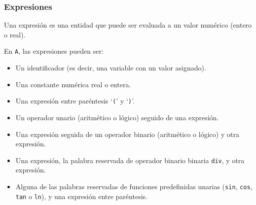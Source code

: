 \documentclass[12pt]{article}
\begin{document}
\subsubsection{Expresiones}
Una expresión es una entidad que puede ser evaluada a un valor numérico (entero o real).\par
En \texttt{A}, las expresiones pueden ser:
\begin{itemize}
    \item Un identificador (es decir, una variable con un valor asignado).
    \item Una constante numérica real o entera.
    \item Una expresión entre paréntesis `\texttt{(}' y `\texttt{)}'.
    \item Un operador unario (aritmético o lógico) seguido de una expresión.
    \item Una expresión seguida de un operador binario (aritmético o lógico) y otra expresión.
    \item Una expresión, la palabra reservada de operador binario binaria \texttt{div}, y otra expresión.
    \item Alguna de las palabras reservadas de funciones predefinidas unarias (\texttt{sin}, \texttt{cos}, \texttt{tan} o \texttt{ln}), y una expresión entre paréntesis.
\end{itemize}
\end{document}

